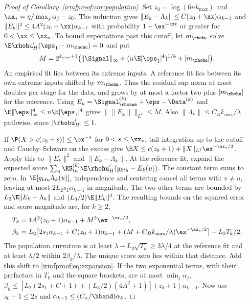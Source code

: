 \begin{proof}[Proof of Corollary~\ref{irmfproof:cor:population}]
Set \(z_0=\log(6n k_{\max})\) and \(\xx_*=\eta/\max_j\alpha_j-z_0\).
The induction gives \(\|E_k-\Lambda_k\|\le C(z_0+\xx)\alpha_{k-1}\)
and \(\|E_k\|^2\le4A^2(z_0+\xx)\alpha_{k-1}\) with probability
\(1-\ex^{-\xx}\) or greater for \(0<\xx\le\xx_*\). To bound expectations
past this cutoff, let \(m_{\rhohu}\) solve \(\E\rhohu_H'(\eps_1-m_{\rhohu})=0\)
and put
\[
 M=2^{k_{\max}+1}\bigl(\|\Signal\|_\infty
           +(n\E|\eps_1|^4)^{1/4}+|m_{\rhohu}|\bigr).
\]
An empirical fit lies between its extreme inputs. A reference fit lies
between its own extreme inputs shifted by \(m_{\rhohu}\). Thus the residual
sup norm at most doubles per stage for the data, and grows by at most a
factor two plus \(|m_{\rhohu}|\) for the reference. Using
\(E_k=\Signal_{\rhohum}^{(k)}+\eps-\Data^{(k)}\) and
\(\E\|\eps\|_\infty^4\le n\E|\eps_1|^4\) gives
\(\|\|E_k\|\|_{L^4}\le M\). Also \(\|\Lambda_k\|\le C_B k_{\max}/\lambda\)
pathwise, since \(|\rhohu_H'|\le1\).

If \(\P(X>c(z_0+s))\le\ex^{-s}\) for \(0<s\le\xx_*\), tail integration up
to the cutoff and Cauchy--Schwarz on the excess give
\(\E X\le c(z_0+1)+\|X\|_{L^2}\ex^{-\xx_*/2}\).
Apply this to \(\|E_k\|^2\) and \(\|E_k-\Lambda_k\|\).
At the reference fit, expand the expected score
\(\sum_u\KS_{tu}^{(k)}\E\rhohu_H'(y_{ktu}-E_k(u))\).
The constant term sums to zero. In \(\E[g_{ktu}\Lambda_k(u)]\), independence
and centering cancel all terms with \(v\ne u\), leaving at most
\(2L_2s_1\alpha_{k-1}\) in magnitude. The two other terms are bounded by
\(L_2\E\|E_k-\Lambda_k\|\) and \((L_3/2)\E\|E_k\|^2\).
The resulting bounds on the squared error and score magnitude are, for \(k\ge2\),
\begin{equation}\label{irmfproof:eq:target-calibration}
 \begin{aligned}
 T_k&=4A^2(z_0+1)\alpha_{k-1}+M^2\ex^{-\xx_*/2},\\
 \beta_k&=L_2\bigl[2s_1\alpha_{k-1}+C(z_0+1)\alpha_{k-1}
        +(M+C_B k_{\max}/\lambda)\ex^{-\xx_*/2}\bigr]+L_3T_k/2 .
 \end{aligned}
\end{equation}
The population curvature is at least \(\lambda-L_3\sqrt{T_k}\ge3\lambda/4\)
at the reference fit and at least \(\lambda/2\) within \(2\beta_k/\lambda\).
The unique score zero lies within that distance. Add this shift to
\eqref{irmfproof:eq:expansion}. If the two exponential terms, with their
prefactors in \(T_k\) and the square brackets, are at most \(\min_j\alpha_j\),
\(\beta_k\le [L_2(2s_1+C+1)+(L_3/2)(4A^2+1)](z_0+1)\alpha_{k-1}\).
Now use \(z_0+1\le2z\) and \(\alpha_{k-1}\le(C_\alpha/\hband)\alpha_k\).
\end{proof}


